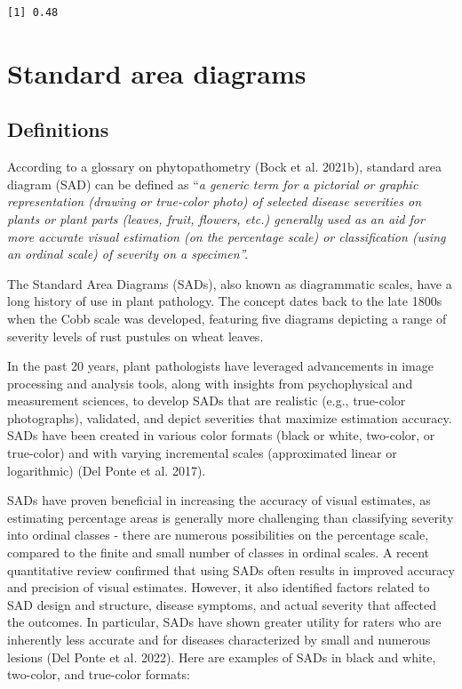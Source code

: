 \documentclass[
  letterpaper,
  DIV=11,
  numbers=noendperiod]{scrreprt}
\begin{document}
\begin{verbatim}
[1] 0.48
\end{verbatim}

\hypertarget{standard-area-diagrams}{%
\chapter{Standard area diagrams}\label{standard-area-diagrams}}

\hypertarget{definitions}{%
\section{Definitions}\label{definitions}}

According to a glossary on phytopathometry (Bock et al. 2021b), standard
area diagram (SAD) can be defined as ``\emph{a generic term for a
pictorial or graphic representation (drawing or true-color photo) of
selected disease severities on plants or plant parts (leaves, fruit,
flowers, etc.) generally used as an aid for more accurate visual
estimation (on the percentage scale) or classification (using an ordinal
scale) of severity on a specimen''.}

The Standard Area Diagrams (SADs), also known as diagrammatic scales,
have a long history of use in plant pathology. The concept dates back to
the late 1800s when the Cobb scale was developed, featuring five
diagrams depicting a range of severity levels of rust pustules on wheat
leaves.

In the past 20 years, plant pathologists have leveraged advancements in
image processing and analysis tools, along with insights from
psychophysical and measurement sciences, to develop SADs that are
realistic (e.g., true-color photographs), validated, and depict
severities that maximize estimation accuracy. SADs have been created in
various color formats (black or white, two-color, or true-color) and
with varying incremental scales (approximated linear or logarithmic)
(Del Ponte et al. 2017).

SADs have proven beneficial in increasing the accuracy of visual
estimates, as estimating percentage areas is generally more challenging
than classifying severity into ordinal classes - there are numerous
possibilities on the percentage scale, compared to the finite and small
number of classes in ordinal scales. A recent quantitative review
confirmed that using SADs often results in improved accuracy and
precision of visual estimates. However, it also identified factors
related to SAD design and structure, disease symptoms, and actual
severity that affected the outcomes. In particular, SADs have shown
greater utility for raters who are inherently less accurate and for
diseases characterized by small and numerous lesions (Del Ponte et al.
2022). Here are examples of SADs in black and white, two-color, and
true-color formats:
\end{document}
